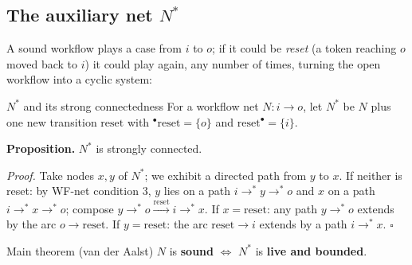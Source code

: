 \subsection{The auxiliary net $N^*$}

A sound workflow plays a case from $i$ to $o$; if it could be \emph{reset} (a token reaching $o$ moved back to $i$) it could play again, any number of times, turning the open workflow into a cyclic system:
\begin{center}
\end{center}

\begin{definitionbox}{$N^*$ and its strong connectedness}
For a workflow net $N : i \to o$, let $N^*$ be $N$ plus one new transition $\text{reset}$ with ${}^\bullet\text{reset} = \{o\}$ and $\text{reset}^\bullet = \{i\}$.
\par\smallskip
\textbf{Proposition.} $N^*$ is strongly connected.
\par\smallskip
\textit{Proof.} Take nodes $x, y$ of $N^*$; we exhibit a directed path from $y$ to $x$. If neither is reset: by WF-net condition 3, $y$ lies on a path $i \to^\ast y \to^\ast o$ and $x$ on a path $i \to^\ast x \to^\ast o$; compose $y \to^\ast o \xrightarrow{\text{reset}} i \to^\ast x$. If $x = \text{reset}$: any path $y \to^\ast o$ extends by the arc $o \to \text{reset}$. If $y = \text{reset}$: the arc $\text{reset} \to i$ extends by a path $i \to^\ast x$. \hfill$\square$
\end{definitionbox}

\begin{definitionbox}{Main theorem (van der Aalst)}
$N$ is \textbf{sound} $\iff$ $N^*$ is \textbf{live and bounded}.
\end{definitionbox}

